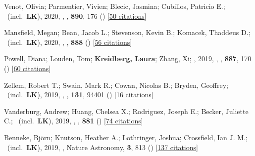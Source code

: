 \item[{\color{numcolor}\scriptsize34}] Venot, Olivia; Parmentier, Vivien; Blecic, Jasmina; Cubillos, Patricio E.; \etal\ (incl.\ \textbf{LK}), 2020, , \apj, \textbf{890}, 176 () [\href{https://ui.adsabs.harvard.edu/abs/2020ApJ...890..176V}{50 citations}]

\item[{\color{numcolor}\scriptsize33}] Mansfield, Megan; Bean, Jacob L.; Stevenson, Kevin B.; Komacek, Thaddeus D.; \etal\ (incl.\ \textbf{LK}), 2020, , \apj, \textbf{888} () [\href{https://ui.adsabs.harvard.edu/abs/2020ApJ...888L..15M}{56 citations}]

\item[{\color{numcolor}\scriptsize32}] Powell, Diana; Louden, Tom; \textbf{Kreidberg, Laura}; Zhang, Xi; \etal, 2019, , \apj, \textbf{887}, 170 () [\href{https://ui.adsabs.harvard.edu/abs/2019ApJ...887..170P}{60 citations}]

\item[{\color{numcolor}\scriptsize31}] Zellem, Robert T.; Swain, Mark R.; Cowan, Nicolas B.; Bryden, Geoffrey; \etal\ (incl.\ \textbf{LK}), 2019, , \pasp, \textbf{131}, 94401 () [\href{https://ui.adsabs.harvard.edu/abs/2019PASP..131i4401Z}{16 citations}]

\item[{\color{numcolor}\scriptsize30}] Vanderburg, Andrew; Huang, Chelsea X.; Rodriguez, Joseph E.; Becker, Juliette C.; \etal\ (incl.\ \textbf{LK}), 2019, , \apj, \textbf{881} () [\href{https://ui.adsabs.harvard.edu/abs/2019ApJ...881L..19V}{74 citations}]

\item[{\color{numcolor}\scriptsize29}] Benneke, Bj{\"o}rn; Knutson, Heather A.; Lothringer, Joshua; Crossfield, Ian J. M.; \etal\ (incl.\ \textbf{LK}), 2019, , Nature Astronomy, \textbf{3}, 813 () [\href{https://ui.adsabs.harvard.edu/abs/2019NatAs...3..813B}{137 citations}]

